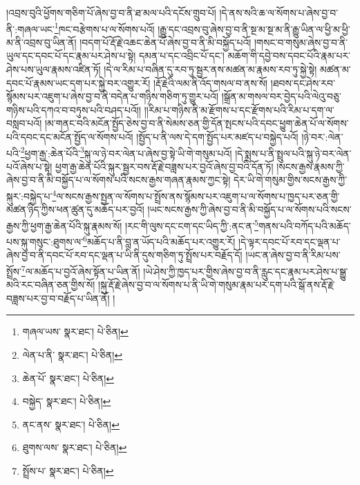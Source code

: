 །འབྲས་བུའི་ཕྱོགས་གཅིག་པོ་ཞེས་བྱ་བ་ནི་ཐ་མལ་པའི་དངོས་གྲུབ་པོ། །དེ་ནས་སའི་ཆ་ལ་སོགས་པ་ཞེས་བྱ་བ་ནི་:གཞལ་ཡང་\footnote{གཞལ་ཡས་  སྣར་ཐང་།  པེ་ཅིན། }ཁང་བརྩེགས་པ་ལ་སོགས་པའོ། །རྒྱུ་དང་འབྲས་བུ་ཞེས་བྱ་བ་ནི་སྔ་མ་སྔ་མ་ནི་རྒྱུ་ཡིན་ལ་ཕྱི་མ་ཕྱི་མ་ནི་འབྲས་བུ་ཡིན་ནོ། །བདག་པོ་རྡོ་རྗེ་འཆང་ཆེན་པོ་ཞེས་བྱ་བ་ནི་མི་བསྐྱོད་པའོ། །གསང་བ་གསུམ་ཞེས་བྱ་བ་ནི་ཡུལ་དང་དབང་པོ་དང་རྣམ་པར་ཤེས་པ་སྟེ། དམན་པ་དང་འབྲིང་པོ་དང་། མཆོག་གི་དབྱེ་བས་དབང་པོའི་རྣམ་པར་ཤེས་པས་ཡུལ་རྣམས་འཛིན་ཏོ། །དེ་ལ་རིམ་པ་བཞིན་དུ་རབ་ཏུ་སྦྱར་ནས་མཚན་མ་རྣམས་རབ་ཏུ་སྐྱེ་སྟེ། མཚན་མ་དབང་པོ་རྣམས་ཡང་དག་པར་སྐྱེ་བར་འགྱུར་རོ། །རྡོ་རྗེའི་ལམ་ནི་འོད་གསལ་བ་ནས་སོ། །ཐབས་དང་ཤེས་རབ་སྙོམས་པར་འཇུག་པ་ཞེས་བྱ་བ་ནི་བདེན་པ་གཉིས་གཅིག་ཏུ་གྱུར་པའོ། །སྒྲོན་མ་གསལ་བར་བྱེད་པའི་ལེའུ་བཅུ་གཉིས་པའི་དཀའ་བ་བཏུས་པའི་བཤད་པའོ།། །།རིམ་པ་གཉིས་ནི་མ་རྫོགས་པ་དང་རྫོགས་པའི་རིམ་པ་དག་ལ་བསླབ་པའོ། །མ་གནང་བའི་མངོན་སྤྱོད་ཅེས་བྱ་བ་ནི་སེམས་ཅན་གྱི་དོན་སྤངས་པའི་དབང་ཕྱུག་ཆེན་པོ་ལ་སོགས་པའི་དབང་དང་མངོན་སྤྱོད་ལ་སོགས་པའོ། །སྤྱོད་པ་ནི་ལས་དེ་དག་སྤྱོད་པར་མཛད་པ་བསྐྱེད་པའོ། །ཉེ་བར་:ལེན་པའི་\footnote{ལེན་པ་ནི་  སྣར་ཐང་།  པེ་ཅིན། }ཕྱག་རྒྱ་:ཆེན་པོའི་\footnote{ཆེན་པོ་  སྣར་ཐང་།  པེ་ཅིན། }སྐུ་ལ་ཉེ་བར་ལེན་པ་ཞེས་བྱ་སྟེ་ཡི་གེ་གསུམ་པའོ། །དེ་སྨྲས་པ་ནི་སྤྲུལ་པའི་སྐུ་ཉེ་བར་ལེན་པའོ་ཞེས་པ་སྟེ། ཕྱག་རྒྱ་ཆེན་པོའི་སྐུར་སྦྱར་བས་རྡོ་རྗེ་བཟླས་པར་བྱའོ་ཞེས་བྱ་བའི་དོན་ཏོ། །སངས་རྒྱས་རྣམས་ཀྱི་ཞེས་བྱ་བ་ནི་མི་བསྐྱོད་པ་ལ་སོགས་པའི་སངས་རྒྱས་གཞན་རྣམས་ཀྱང་སྟེ། དེར་ཡི་གེ་གསུམ་གྱིས་སངས་རྒྱས་ཀྱི་སྐུར་:བསྐྱེད་པ་\footnote{བསྐྱེད་  སྣར་ཐང་།  པེ་ཅིན། }ལ་སངས་རྒྱས་སྤྱན་ལ་སོགས་པ་སྤྲོས་ནས་སྙོམས་པར་འཇུག་པ་ལ་སོགས་པ་ཁྱད་པར་ཅན་གྱི་མཚན་ཉིད་ཀྱིས་ཕན་ཚུན་དུ་མཆོད་པར་བྱའོ། །ཡང་སངས་རྒྱས་ཀྱི་ཞེས་བྱ་བ་ནི་མི་བསྐྱོད་པ་ལ་སོགས་པའི་སངས་རྒྱས་ཀྱི་ཕྱག་རྒྱ་ཆེན་པོའི་སྐུ་རྣམས་སོ། །རང་གི་ལུས་དང་ངག་དང་ཡིད་ཀྱི་:ནང་ན་\footnote{ནང་ནས་  སྣར་ཐང་།  པེ་ཅིན། }གནས་པའི་བཀོད་པའི་མཆོད་པས་སྐུ་གསུང་:ཐུགས་ལ་\footnote{ཐུགས་ལས་  སྣར་ཐང་།  པེ་ཅིན། }མཆོད་པ་ནི་བླ་ན་ཡོད་པའི་མཆོད་པར་འགྱུར་རོ། །དེ་ལྟར་དབང་པོ་རབ་དང་ལྡན་པ་ཞེས་བྱ་བ་ནི་དབང་པོ་རབ་དང་ལྡན་པ་ཡི་ནི་དུས་གཅིག་ཏུ་སྤྲོས་པར་བརྗོད་དོ། །ཡང་ན་ཞེས་བྱ་བ་ནི་རིམ་པས་སྤྲོས་\footnote{སྤྲོས་པ་  སྣར་ཐང་།  པེ་ཅིན། }ལ་མཆོད་པ་བྱའོ་ཞེས་སྟོན་པ་ཡིན་ནོ། །ཡེ་ཤེས་ཀྱི་ཁྱད་པར་གྱིས་ཞེས་བྱ་བ་ནི་རླུང་དང་རྣམ་པར་ཤེས་པ་སྒྱུ་མའི་རང་བཞིན་ཅན་གྱིས་སོ། །སྐུ་རྡོ་རྗེ་ཞེས་བྱ་བ་ལ་སོགས་པ་ནི་ཡི་གེ་གསུམ་རྣམ་པར་དག་པའི་སྒོ་ནས་རྡོ་རྗེ་བཟླས་པར་བྱ་བ་བརྗོད་པ་ཡིན་ནོ། །
